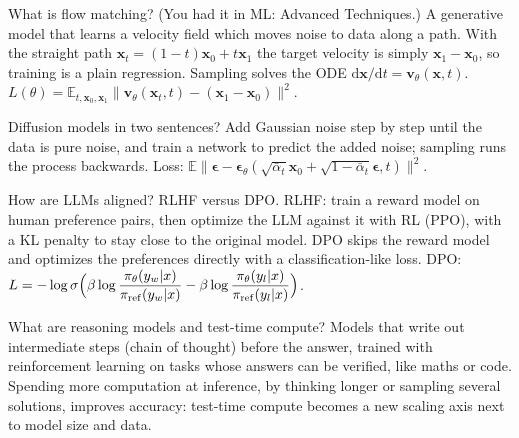 
\begin{qabox}[general]{\pred What is flow matching? (You had it in ML: Advanced Techniques.)}
\ans A generative model that learns a velocity field which moves noise to data along a path. With
the straight path $\mathbf{x}_t=(1-t)\mathbf{x}_0+t\mathbf{x}_1$ the target velocity is simply
$\mathbf{x}_1-\mathbf{x}_0$, so training is a plain regression. Sampling solves the ODE
$\mathrm{d}\mathbf{x}/\mathrm{d}t=\mathbf{v}_\theta(\mathbf{x},t)$.
\formula $L(\theta)=\mathbb{E}_{t,\mathbf{x}_0,\mathbf{x}_1}\bigl\lVert\mathbf{v}_\theta(\mathbf{x}_t,t)-(\mathbf{x}_1-\mathbf{x}_0)\bigr\rVert^2$.
\end{qabox}

\begin{qabox}[general]{\pred Diffusion models in two sentences?}
\ans Add Gaussian noise step by step until the data is pure noise, and train a network to predict
the added noise; sampling runs the process backwards. Loss:
$\mathbb{E}\lVert\bm\epsilon-\bm\epsilon_\theta(\sqrt{\bar\alpha_t}\mathbf{x}_0+\sqrt{1-\bar\alpha_t}\bm\epsilon,t)\rVert^2$.
\end{qabox}

\begin{qabox}[general]{\pred How are LLMs aligned? RLHF versus DPO.}
\ans RLHF: train a reward model on human preference pairs, then optimize the LLM against it with
RL (PPO), with a KL penalty to stay close to the original model. DPO skips the reward model and
optimizes the preferences directly with a classification-like loss.
\formula DPO: $L=-\log\sigma\Bigl(\beta\log\dfrac{\pi_\theta(y_w|x)}{\pi_{\mathrm{ref}}(y_w|x)}-\beta\log\dfrac{\pi_\theta(y_l|x)}{\pi_{\mathrm{ref}}(y_l|x)}\Bigr)$.
\end{qabox}

\begin{qabox}[general]{\pred What are reasoning models and test-time compute?}
\ans Models that write out intermediate steps (chain of thought) before the answer, trained with
reinforcement learning on tasks whose answers can be verified, like maths or code. Spending more
computation at inference, by thinking longer or sampling several solutions, improves accuracy:
test-time compute becomes a new scaling axis next to model size and data.
\end{qabox}

